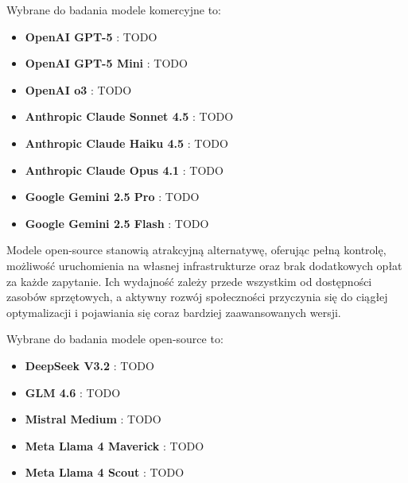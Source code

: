 Wybrane do badania modele komercyjne to:

\begin{itemize}
    \item \textbf{OpenAI GPT-5} \cite{gpt5}: TODO

    \item \textbf{OpenAI GPT-5 Mini} \cite{gpt5mini}: TODO

    \item \textbf{OpenAI o3} \cite{o3}: TODO

    \item \textbf{Anthropic Claude Sonnet 4.5} \cite{claude_sonnet45}: TODO

    \item \textbf{Anthropic Claude Haiku 4.5} \cite{claude_haiku45}: TODO

    \item \textbf{Anthropic Claude Opus 4.1} \cite{claude_opus41}: TODO

    \item \textbf{Google Gemini 2.5 Pro} \cite{gemini25_pro}: TODO

    \item \textbf{Google Gemini 2.5 Flash} \cite{gemini25_flash}: TODO
\end{itemize}

Modele open-source stanowią atrakcyjną alternatywę, oferując pełną kontrolę, możliwość uruchomienia na własnej infrastrukturze oraz brak dodatkowych opłat za każde zapytanie. Ich wydajność zależy przede wszystkim od dostępności zasobów sprzętowych, a aktywny rozwój społeczności przyczynia się do ciągłej optymalizacji i pojawiania się coraz bardziej zaawansowanych wersji.

Wybrane do badania modele open-source to:

\begin{itemize}
    \item \textbf{DeepSeek V3.2} \cite{deepseek_v32}: TODO

    \item \textbf{GLM 4.6} \cite{glm46}: TODO

    \item \textbf{Mistral Medium} \cite{mistral_medium}: TODO

    \item \textbf{Meta Llama 4 Maverick} \cite{llama4_maverick}: TODO

    \item \textbf{Meta Llama 4 Scout} \cite{llama4_scout}: TODO
\end{itemize}


